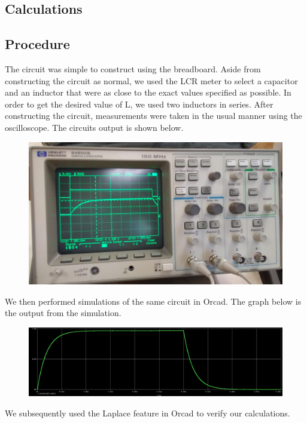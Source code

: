 \documentclass[11pt]{article}
\begin{document}
	
	\subsection*{Calculations}
	
	\subsection*{Procedure}
	The circuit was simple to construct using the breadboard. Aside from constructing the circuit as normal, we used the LCR meter to select a capacitor and an inductor that were as close to the exact values specified as possible. In order to get the desired value of L, we used two inductors in series. After constructing the circuit, measurements were taken in the usual manner using the oscilloscope. The circuits output is shown below.
		\begin{figure}[H]
		\centering
		\includegraphics[width=5in]{images/oscilloscope_transfer.jpg}
		\end{figure}
	We then performed simulations of the same circuit in Orcad. The graph below is the output from the simulation.
		\begin{figure}[H]
		\centering
		\includegraphics[width=6in]{images/simulated_curve.png}
		\end{figure}

	We subsequently used the Laplace feature in Orcad to verify our calculations. 
	
\end{document}
